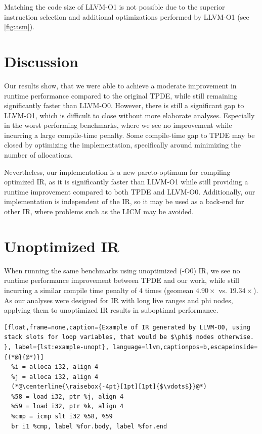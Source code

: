 Matching the code size of LLVM-O1 is not possible due to the superior instruction selection and additional optimizations performed by LLVM-O1 (see \autoref{fig:asm}).
\section{Discussion}

Our results show, that we were able to achieve a moderate improvement in runtime performance compared to the original TPDE, while still remaining significantly faster than LLVM-O0. However, there is still a significant gap to LLVM-O1, which is difficult to close without more elaborate analyses. Especially in the worst performing benchmarks, where we see no improvement while incurring a large compile-time penalty.
Some compile-time gap to TPDE may be closed by optimizing the implementation, specifically around minimizing the number of allocations.

Nevertheless, our implementation is a new pareto-optimum for compiling optimized IR, as it is significantly faster than LLVM-O1 while still providing a runtime improvement compared to both TPDE and LLVM-O0. Additionally, our implementation is independent of the IR, so it may be used as a back-end for other IR, where problems such as the LICM may be avoided.


\section{Unoptimized IR}

When running the same benchmarks using unoptimized (-O0) IR, we see no runtime performance improvement between TPDE and our work, while still incurring a similar compile time penalty of $4$ times (geomean $4.90\times$ vs. $19.34\times$). 
As our analyses were designed for IR with long live ranges and phi nodes, applying them to unoptimized IR results in suboptimal performance.

\begin{lstlisting}[float,frame=none,caption={Example of IR generated by LLVM-O0, using stack slots for loop variables, that would be $\phi$ nodes otherwise. }, label={lst:example-unopt}, language=llvm,captionpos=b,escapeinside={(*@}{@*)}]
  %i = alloca i32, align 4
  %j = alloca i32, align 4
  (*@\centerline{\raisebox{-4pt}[1pt][1pt]{$\vdots$}}@*)
  %58 = load i32, ptr %j, align 4
  %59 = load i32, ptr %k, align 4
  %cmp = icmp slt i32 %58, %59
  br i1 %cmp, label %for.body, label %for.end
\end{lstlisting}

